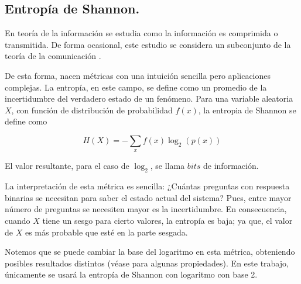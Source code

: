 \documentclass[../main.tex]{subfiles}
\begin{document}
\newline
\subsection{Entropía de Shannon.}

En teoría de la información se estudia como la información es comprimida o transmitida. De forma ocasional, este estudio se  considera un subconjunto de la teoría de la comunicación \cite{cover2006elements}.

De esta forma, nacen métricas con una intuición sencilla pero aplicaciones complejas. La entropía, en este campo, se define como un promedio de la incertidumbre del verdadero estado de un fenómeno. Para una variable aleatoria $X$, con función de distribución de probabilidad $f(x)$, la entropia de Shannon se define como

\begin{equation}
    \label{shannon-entropy}
    H(X) = - \sum_{x} f(x) \log_{2} ( p(x))
\end{equation}

El valor resultante, para el caso de $\log_{2}$, se llama $bits$ de información.

La interpretación de esta métrica es sencilla: ¿Cuántas preguntas con respuesta binarias se necesitan para saber el estado actual del sistema? Pues, entre mayor número de preguntas se necesiten mayor es la incertidumbre. En consecuencia, cuando $X$ tiene un sesgo para cierto valores, la entropía es baja; ya que, el valor de $X$ es más probable que esté en la parte sesgada.

Notemos que se puede cambiar la base del logaritmo en esta métrica, obteniendo posibles resultados distintos (véase \cite{cover2006elements} para algunas propiedades). En este trabajo, únicamente se usará la entropía de Shannon con logaritmo con base 2.
\end{document}
